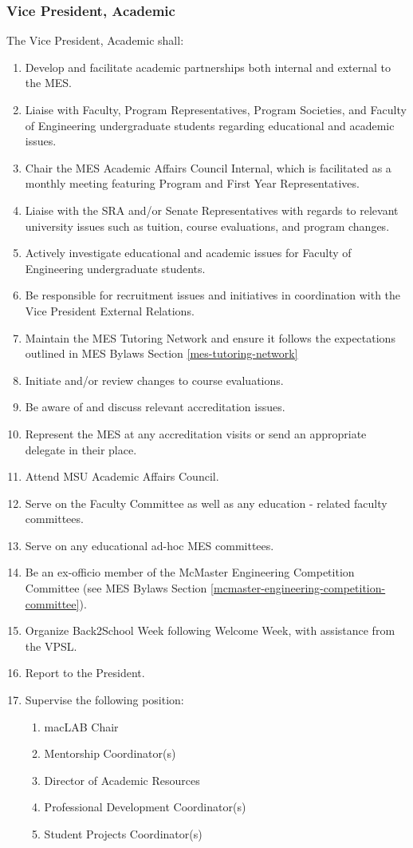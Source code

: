 \subsubsection{Vice President,
 Academic}
\label{vice-president-academic}
The Vice President, Academic shall:

\begin{enumerate}
 \item
  Develop and facilitate academic partnerships both internal and external to the MES.
 \item
  Liaise with Faculty, Program Representatives, Program Societies, and Faculty of Engineering undergraduate students regarding educational and academic issues.
 \item
  Chair the MES Academic Affairs Council Internal, which is facilitated as a monthly meeting featuring Program and First Year Representatives.
 \item
  Liaise with the SRA and/or Senate Representatives with regards to relevant university issues such as tuition, course evaluations, and program changes.
 \item
  Actively investigate educational and academic issues for Faculty of Engineering undergraduate students.
 \item
  Be responsible for recruitment issues and initiatives in coordination with the Vice President External Relations.
 \item
  Maintain the MES Tutoring Network and ensure it follows the expectations outlined in MES Bylaws Section \ref{mes-tutoring-network}
 \item
  Initiate and/or review changes to course evaluations.
 \item
  Be aware of and discuss relevant accreditation issues.
 \item
  Represent the MES at any accreditation visits or send an appropriate delegate in their place.
 \item
  Attend MSU Academic Affairs Council.
 \item
  Serve on the Faculty Committee as well as any education - related faculty committees.
 \item
  Serve on any educational ad-hoc MES committees.
 \item
  Be an ex-officio member of the McMaster Engineering Competition Committee (see MES Bylaws Section \ref{mcmaster-engineering-competition-committee}).
 \item
  Organize Back2School Week following Welcome Week, with assistance from the VPSL.
 \item
  Report to the President.
 \item
  Supervise the following position:

  \begin{enumerate}
   \item
    macLAB Chair
   \item
    Mentorship Coordinator(s)
   \item
    Director of Academic Resources
   \item
    Professional Development Coordinator(s)
   \item
    Student Projects Coordinator(s)

  \end{enumerate}
\end{enumerate}